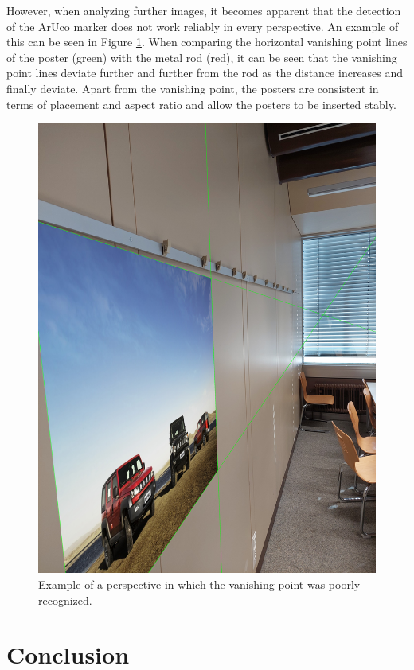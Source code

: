 \documentclass[a4paper,twocolumn]{article}
\begin{document}
However, when analyzing further images, it becomes apparent that the detection of the ArUco marker does not work reliably in every perspective. An example of this can be seen in Figure \ref{fig:bad-example-result}. When comparing the horizontal vanishing point lines of the poster (green) with the metal rod (red), it can be seen that the vanishing point lines deviate further and further from the rod as the distance increases and finally deviate.
Apart from the vanishing point, the posters are consistent in terms of placement and aspect ratio and allow the posters to be inserted stably.\begin{figure}[htbp]
    \centering
    \includegraphics[width=0.9\columnwidth]{img/img_result_bad_113437.jpg} %
    \caption{Example of a perspective in which the vanishing point was poorly recognized.}
    \label{fig:bad-example-result}
\end{figure}

\pagebreak
\section{Conclusion}
\end{document}
